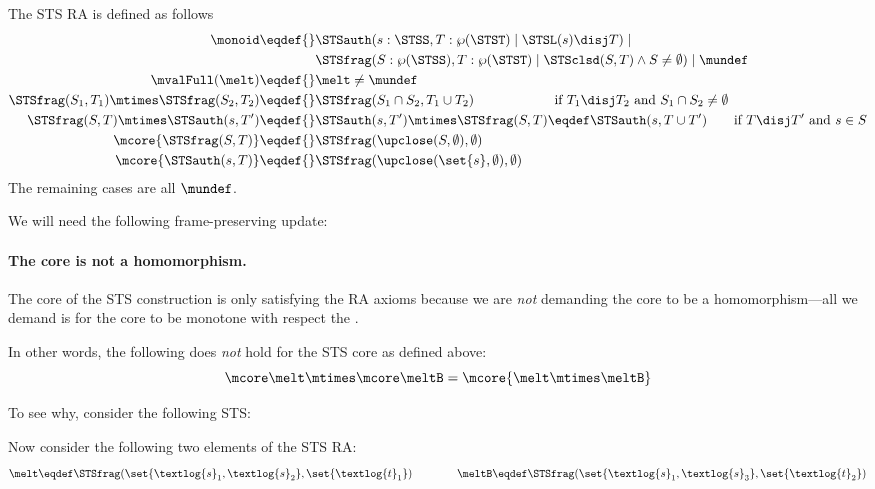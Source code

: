 The STS RA is defined as follows
\begin{align*}
  \monoid \eqdef{}& \STSauth(s:\STSS, T:\wp(\STST) \mid \STSL(s) \disj T) \mid{}\\& \STSfrag(S: \wp(\STSS), T: \wp(\STST) \mid \STSclsd(S, T) \land S \neq \emptyset) \mid \mundef \\
  \mvalFull(\melt) \eqdef{}& \melt \neq \mundef \\
  \STSfrag(S_1, T_1) \mtimes \STSfrag(S_2, T_2) \eqdef{}& \STSfrag(S_1 \cap S_2, T_1 \cup T_2) \qquad\qquad\qquad \text{if $T_1 \disj T_2$ and $S_1 \cap S_2 \neq \emptyset$} \\
  \STSfrag(S, T) \mtimes \STSauth(s, T') \eqdef{}& \STSauth(s, T') \mtimes \STSfrag(S, T) \eqdef \STSauth(s, T \cup T') \qquad \text{if $T \disj T'$ and $s \in S$} \\
  \mcore{\STSfrag(S, T)} \eqdef{}& \STSfrag(\upclose(S, \emptyset), \emptyset) \\
  \mcore{\STSauth(s, T)} \eqdef{}& \STSfrag(\upclose(\set{s}, \emptyset), \emptyset)
\end{align*}
The remaining cases are all $\mundef$.

We will need the following frame-preserving update:

\paragraph{The core is not a homomorphism.}
The core of the STS construction is only satisfying the RA axioms because we are \emph{not} demanding the core to be a homomorphism---all we demand is for the core to be monotone with respect the .

In other words, the following does \emph{not} hold for the STS core as defined above:
\[ \mcore\melt \mtimes \mcore\meltB = \mcore{\melt\mtimes\meltB} \]

To see why, consider the following STS:
\newcommand\st{\textlog{s}}
\newcommand\tok{\textlog{t}}
\begin{center}
\end{center}
Now consider the following two elements of the STS RA:
\[ \melt \eqdef \STSfrag(\set{\st_1,\st_2}, \set{\tok_1}) \qquad\qquad
  \meltB \eqdef \STSfrag(\set{\st_1,\st_3}, \set{\tok_2}) \]

